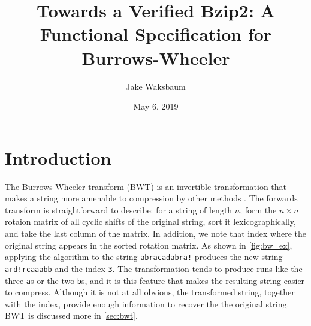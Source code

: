 \documentclass[11pt]{thesis}
\title{Towards a Verified Bzip2: A Functional Specification for Burrows-Wheeler}
\author{Jake Waksbaum}
\date{May 6, 2019}
\begin{document}
\maketitle

\section{Introduction}
\label{sec:intro}

The Burrows-Wheeler transform (BWT) is an invertible transformation
that makes a string more amenable to compression by other methods
\cite{bw}. The forwards transform is straightforward to describe: for
a string of length \(n\), form the \(n \times n\) rotaion matrix of all
cyclic shifts of the original string, sort it lexicographically, and
take the last column of the matrix. In addition, we note that index
where the original string appears in the sorted rotation matrix. As
shown in \cref{fig:bw_ex}, applying the algorithm to the string
\texttt{abracadabra!} produces the new string \texttt{ard!rcaaabb} and
the index \texttt{3}. The transformation tends to produce runs like
the three \texttt{a}s or the two \texttt{b}s, and it is this feature
that makes the resulting string easier to compress. Although it is not
at all obvious, the transformed string, together with the index,
provide enough information to recover the the original string. BWT is
discussed more in \cref{sec:bwt}.
\end{document}
